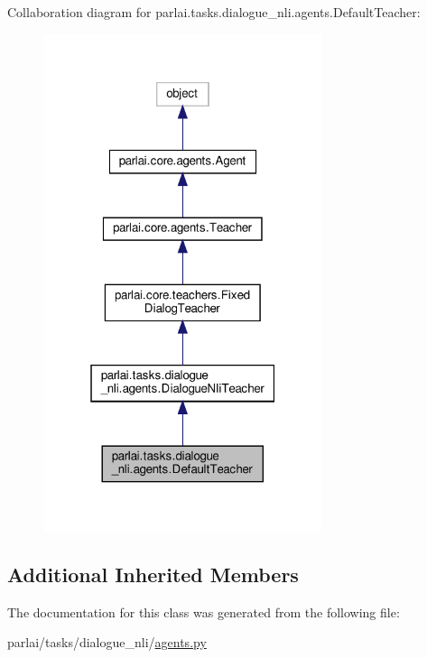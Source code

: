 Collaboration diagram for parlai.\+tasks.\+dialogue\+\_\+nli.\+agents.\+Default\+Teacher\+:
\nopagebreak
\begin{figure}[H]
\begin{center}
\leavevmode
\includegraphics[width=232pt]{classparlai_1_1tasks_1_1dialogue__nli_1_1agents_1_1DefaultTeacher__coll__graph}
\end{center}
\end{figure}
\subsection*{Additional Inherited Members}


The documentation for this class was generated from the following file\+:\begin{DoxyCompactItemize}
\item 
parlai/tasks/dialogue\+\_\+nli/\hyperlink{parlai_2tasks_2dialogue__nli_2agents_8py}{agents.\+py}\end{DoxyCompactItemize}
